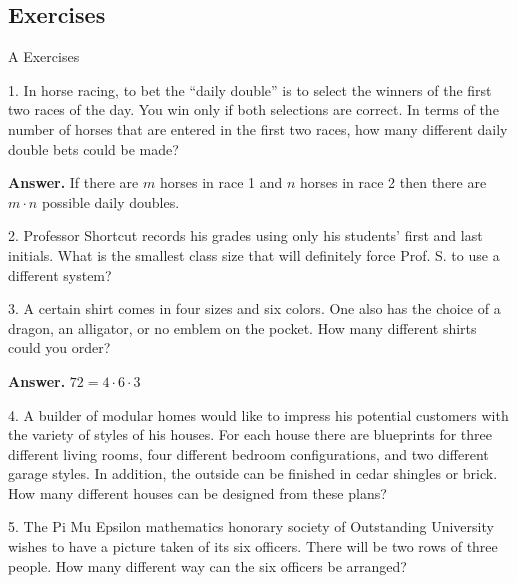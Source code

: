 \documentclass[10pt,]{book}
\theoremstyle{plain}
\theoremstyle{definition}
\theoremstyle{definition}
\theoremstyle{definition}
\begin{document}
\subsection[Exercises]{Exercises}\label{EXERCISES-FOR-SECTION-2-1}
\hypertarget{exercisegroup-1}{}\typeout{************************************************}
\typeout{************************************************}
A Exercises%
\begin{exercisegroup}
\item[1.]\hypertarget{exercise-1}{} In horse racing, to bet the ``daily double'' is to select the winners of the first two races of the day. You win only if both selections are correct. In terms of the number of horses that are entered in the first two races, how many different daily double bets could be made?%
\par\smallskip
\par\smallskip
\noindent\textbf{Answer.}\hypertarget{answer-1}{}\quad
 If there are \(m\) horses in race 1 and \(n\) horses in race 2 then there are \(m \cdot n\) possible daily doubles.%
\item[2.]\hypertarget{exercise-2}{} Professor Shortcut records his grades using only his students' first and last initials. What is the smallest class size that will definitely force Prof. S. to use a different system?%
\par\smallskip
\item[3.]\hypertarget{exercise-3}{}  A certain shirt comes in four sizes and six colors. One also has the choice of a dragon, an alligator, or no emblem on the pocket. How many different shirts could you order?%
\par\smallskip
\par\smallskip
\noindent\textbf{Answer.}\hypertarget{answer-2}{}\quad
  \(72=4\cdot 6\cdot 3\)%
\item[4.]\hypertarget{exercise-4}{}  A builder of modular homes would like to impress his potential customers with the variety of styles of his houses. For each house there are blueprints for three different living rooms, four different bedroom configurations, and two different garage styles. In addition, the outside can be finished in cedar shingles or brick. How many different houses can be designed from these plans?%
\par\smallskip
\item[5.]\hypertarget{exercise-5}{}  The Pi Mu Epsilon mathematics honorary society of Outstanding University wishes to have a picture taken of its six officers. There will be two rows of three people. How many different way can the six officers be arranged?%

\end{exercisegroup}
\end{document}
